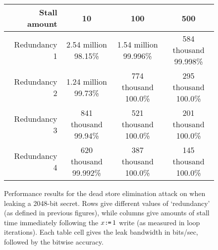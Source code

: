 \documentclass[conference]{IEEEtran}
\theoremstyle{plain}
\theoremstyle{definition}
\begin{document}
\begin{figure}
  \small
  \begin{tabular}{ r | c | c | c }%
    Stall amount & 10 &
                   100 &
                   500 \\ \hline
    Redundancy 1 & \makecell{2.54 million\\98.15\%} &
                   \makecell{1.54 million\\99.996\%} &
                   \makecell{584 thousand\\99.998\%} \\ \hline
    Redundancy 2 & \makecell{1.24 million\\99.73\%} &
                   \makecell{774 thousand\\100.0\%} &
                   \makecell{295 thousand\\100.0\%} \\ \hline
    Redundancy 3 & \makecell{841 thousand\\99.94\%} &
                   \makecell{521 thousand\\100.0\%} &
                   \makecell{201 thousand\\100.0\%} \\ \hline
    Redundancy 4 & \makecell{620 thousand\\99.992\%} &
                   \makecell{387 thousand\\100.0\%} &
                   \makecell{145 thousand\\100.0\%} \\
  \end{tabular}
  \caption{
    Performance results for the dead store elimination attack on {\GCC} when
    leaking a 2048-bit secret.
    Rows give different values of `redundancy' (as defined in previous figures),
    while columns give amounts of stall time immediately following the
    $x\texttt{:}\mkern-1mu\texttt{=}\, 1$ write (as measured in loop iterations).
    Each table cell gives the leak bandwidth in bits/sec, followed by the
    bitwise accuracy.
  }
  \label{fig:gcc-dse-perf}
\end{figure}
\end{document}

